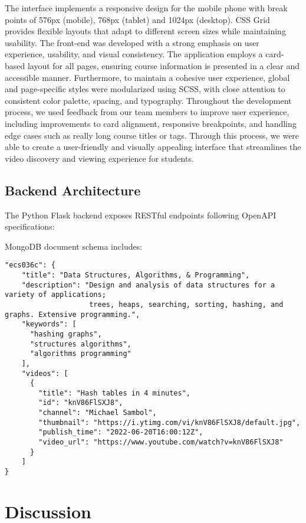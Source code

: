 \documentclass[manuscript,nonacm]{acmart}
\begin{document}
The interface implements a responsive design for the mobile phone with break points of 576px (mobile), 768px (tablet) and 1024px (desktop). CSS Grid provides flexible layouts that adapt to different screen sizes while maintaining usability.
The front-end was developed with a strong emphasis on user experience, usability, and visual consistency. The application employs a card-based layout for all pages, ensuring course information is presented in a clear and accessible manner. 
Furthermore, to maintain a cohesive user experience, global and page-specific styles were modularized using SCSS, with close attention to consistent color palette, spacing, and typography.
Throughout the development process, we used feedback from our team members to improve user experience, including improvements to card alignment, responsive breakpoints, and handling edge cases such as really long course titles or tags.
Through this process, we were able to create a user-friendly and visually appealing interface that streamlines the video discovery and viewing experience for students.

\subsection{Backend Architecture}

The Python Flask backend exposes RESTful endpoints following OpenAPI specifications:

MongoDB document schema includes:
\\
\begin{verbatim}
"ecs036c": {
    "title": "Data Structures, Algorithms, & Programming",
    "description": "Design and analysis of data structures for a variety of applications;
                    trees, heaps, searching, sorting, hashing, and graphs. Extensive programming.",
    "keywords": [
      "hashing graphs",
      "structures algorithms",
      "algorithms programming"
    ],
    "videos": [
      {
        "title": "Hash tables in 4 minutes",
        "id": "knV86FlSXJ8",
        "channel": "Michael Sambol",
        "thumbnail": "https://i.ytimg.com/vi/knV86FlSXJ8/default.jpg",
        "publish_time": "2022-06-20T16:00:12Z",
        "video_url": "https://www.youtube.com/watch?v=knV86FlSXJ8"
      }
    ]
}
\end{verbatim}

\section{Discussion}
\end{document}
